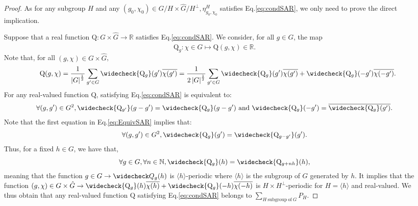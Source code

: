 \documentclass[a4paper, notitlepage, 11pt]{article}
\numberwithin{equation}{section}
\newcommand{\N}{\mathbb{N}}
\newcommand{\R}{\mathbb{R}}
\newcommand{\card}[1]{\left|#1\right|}
\begin{document}
\begin{proof}
    As for any subgroup $H$ and any $(g_0,\chi_0)\in G/H\times\hat{G}/H^{\perp}, \eta^{H}_{g_0,\chi_0}$ satisfies Eq.\eqref{eq:condSAR}, we only need to prove the direct implication.
    
    Suppose that a real function $\mathrm{Q}:G\times \hat{G} \to \R$ satisfies Eq.\eqref{eq:condSAR}. We consider, for all $g\in G$, the map
    \begin{equation}
        \mathrm{Q}_g: \chi\in \hat{G} \mapsto \mathrm{Q}(g,\chi)\in\R.
    \end{equation}
    Note that, for all $(g,\chi)\in G\times\hat{G}$,
    \begin{equation}\label{eq:sumQ}
     \quad \mathrm{Q}(g,\chi) = \frac{1}{\card{G}^{\frac{1}{2}}}\sum_{g'\in G} \widecheck{\mathrm{Q}_{g}}(g')\overline{\chi(g')} = \frac{1}{2\card{G}^{\frac{1}{2}}}\sum_{g'\in G} \widecheck{\mathrm{Q}_{g}}(g')\overline{\chi(g')} + \widecheck{\mathrm{Q}_{g}}(-g')\overline{\chi(-g')}.
    \end{equation}
    For any real-valued function $\mathrm{Q}$, satisfying Eq.\eqref{eq:condSAR} is equivalent to:
    \begin{equation}\label{eq:EquivSAR}
        \forall (g,g')\in G^{2}, \widecheck{\mathrm{Q}_{g'}}(g-g') = \widecheck{\mathrm{Q}_{g}}(g-g') \mathrm{ \ and \ }  \widecheck{\mathrm{Q}_{g}}(-g') = \overline{\widecheck{\mathrm{Q}_{g}}(g')}.
    \end{equation}
    Note that the first equation in Eq.\eqref{eq:EquivSAR} implies that:
    \begin{equation}
        \forall (g,g')\in G^{2}, \widecheck{\mathrm{Q}_{g}}(g') = \widecheck{\mathrm{Q}_{g-g'}}(g').
    \end{equation} 
    Thus, for a fixed $h\in G$, we have that,
    \begin{equation}
        \forall g\in G,\forall n\in\N, \widecheck{\mathrm{Q}_{g}}(h) = \widecheck{\mathrm{Q}_{g+nh}}(h),
    \end{equation}
    meaning that the function $g\in G \to \widecheck Q_{g}(h)$ is $\langle h \rangle$-periodic where $\langle h \rangle$ is the subgroup of $G$ generated by $h$.
    It implies that the function $(g,\chi)\in G\times \hat{G} \to \widecheck{\mathrm{Q}_{g}}(h)\overline{\chi(h)} + \widecheck{\mathrm{Q}_{g}}(-h)\overline{\chi(-h)}$ is $H\times H^{\perp}$-periodic for $H=\langle h \rangle$ and real-valued. We thus obtain that any real-valued function $\mathrm{Q}$ satisfying Eq.\eqref{eq:condSAR} belongs to $\displaystyle\sum_{H \mathrm{ \ subgroup \ of \ } G} P_{H}$.
\end{proof}
\end{document}
